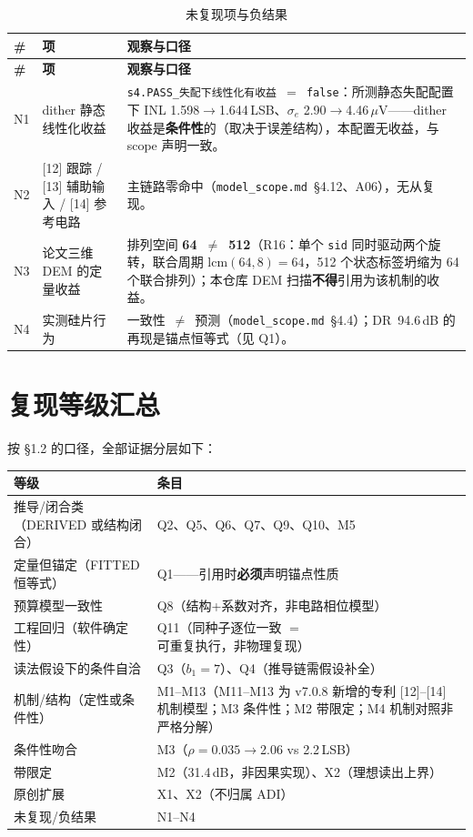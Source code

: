 \documentclass[11pt,a4paper,fontset=fandol]{ctexart}
\newcommand{\rec}[1]{\texttt{#1}}
\newcommand{\uV}{\ensuremath{\,\mu\mathrm{V}}}
\begin{document}
\begin{longtable}{@{}p{0.7cm}p{5.2cm}p{9.2cm}@{}}
\caption{未复现项与负结果}\label{tab:neg}\\
\toprule
\textbf{\#} & \textbf{项} & \textbf{观察与口径}\\
\midrule
\endfirsthead
\toprule
\textbf{\#} & \textbf{项} & \textbf{观察与口径}\\
\midrule
\endhead
\bottomrule
\endfoot
N1 & dither 静态线性化收益 & \rec{s4.PASS\_失配下线性化有收益~$=$~false}：所测静态失配配置下 INL 1.598$\to$1.644\,LSB、$\sigma_e$ 2.90$\to$4.46\uV{}——dither 收益是\textbf{条件性}的（取决于误差结构），本配置无收益，与 scope 声明一致。\\
N2 & [12] 跟踪 / [13] 辅助输入 / [14] 参考电路 & 主链路零命中（\texttt{model\_scope.md}~\S4.12、A06），无从复现。\\
N3 & 论文三维 DEM 的定量收益 & 排列空间 \textbf{64~$\neq$~512}（R16：单个 \rec{sid} 同时驱动两个旋转，联合周期 $\mathrm{lcm}(64,8)=64$，512 个状态标签坍缩为 64 个联合排列）；本仓库 DEM 扫描\textbf{不得}引用为该机制的收益。\\
N4 & 实测硅片行为 & 一致性~$\neq$~预测（\texttt{model\_scope.md}~\S4.4）；DR~94.6\,dB 的再现是锚点恒等式（见 Q1）。\\
\end{longtable}

\FloatBarrier
\section{复现等级汇总}

按 \S1.2 的口径，全部证据分层如下：

\begin{table}[h]\centering\small
\begin{tabular}{@{}p{5.2cm}p{9.2cm}@{}}
\toprule
\textbf{等级} & \textbf{条目}\\
\midrule
推导/闭合类（DERIVED 或结构闭合） & Q2、Q5、Q6、Q7、Q9、Q10、M5\\
定量但锚定（FITTED 恒等式） & Q1——引用时\textbf{必须}声明锚点性质\\
预算模型一致性 & Q8（结构+系数对齐，非电路相位模型）\\
工程回归（软件确定性） & Q11（同种子逐位一致 $=$ 可重复执行，非物理复现）\\
读法假设下的条件自洽 & Q3（$b_1{=}7$）、Q4（推导链需假设补全）\\
机制/结构（定性或条件性） & M1--M13（M11--M13 为 v7.0.8 新增的专利 [12]--[14] 机制模型；M3 条件性；M2 带限定；M4 机制对照非严格分解）\\
条件性吻合 & M3（$\rho=0.035\to$2.06 vs 2.2\,LSB）\\
带限定 & M2（31.4\,dB，非因果实现）、X2（理想读出上界）\\
原创扩展 & X1、X2（不归属 ADI）\\
未复现/负结果 & N1--N4\\
\bottomrule
\end{tabular}
\end{table}
\end{document}
